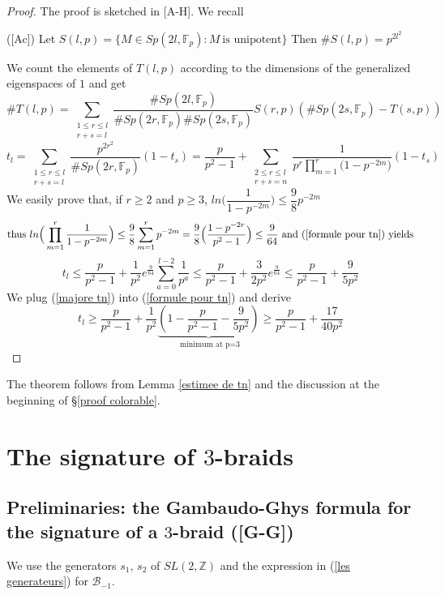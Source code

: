 \documentclass[12pt]{article}
\begin{document}
\begin{proof}
	The proof is sketched in [A-H].  We recall
	\begin{prop}([Ac]) Let $S(l,p)=\{M\in Sp(2l, \mathbb{F}_p): M\ \mbox{is unipotent}\}$ Then $\# S(l,p)=p^{2l^2}$
\end{prop}
We count the elements of $T(l,p)$ according to the dimensions of the generalized eigenspaces of $1$ and get
$$\# T(l,p)=\sum\limits_{\substack{1\leq r\leq l\\ 
		r+s=l}}\dfrac{\# Sp(2l, \mathbb{F}_p)}{\# Sp(2r, \mathbb{F}_p)\# Sp(2s, \mathbb{F}_p)}S(r,p)(\# Sp(2s, \mathbb{F}_p)-T(s,p))$$
\begin{equation}\label{formule pour tn}
t_l=\sum\limits_{\substack{1\leq r\leq l\\ 
		r+s=l}}\dfrac{p^{2r^2}}{\# Sp(2r, \mathbb{F}_p)}(1- t_s)
=\dfrac{p}{p^2-1}+\sum\limits_{\substack{2\leq r\leq l \\ 
		r+s=n}}\dfrac{1}{p^r\prod\limits_{m=1}^r\Big(1-p^{-2m}\Big)}(1- t_s)
\end{equation}
We easily prove that, if $r\geq 2$ and $p\geq 3$, $ln\Big(\dfrac{1}{1-p^{-2m}}\Big)\leq \dfrac{9}{8}p^{-2m}$\\
\[\mbox{thus}\ ln\Big(\prod\limits_{m=1}^r\dfrac{1}{1-p^{-2m}}\Big)
\leq \dfrac{9}{8}\sum_{m=1}^rp^{-2m}=\dfrac{9}{8}\Big(\dfrac{1-p^{-2r}}{p^2-1}\Big)\leq \dfrac{9}{64}\ \mbox{and (\ref{formule pour tn}) yields}\] 
\begin{equation}\label{majore tn}
t_l\leq \dfrac{p}{p^2-1}+\dfrac{1}{p^2}e^{\frac{9}{64}}\sum_{a=0}^{l-2}\dfrac{1}{p^a}\leq 
\dfrac{p}{p^2-1}+\dfrac{3}{2p^2}e^{\frac{9}{64}}\leq \dfrac{p}{p^2-1}+\dfrac{9}{5p^2}
\end{equation}
We plug (\ref{majore tn}) into (\ref{formule pour tn}) and derive
$$
t_l\geq \dfrac{p}{p^2-1}+\dfrac{1}{p^2}\underbrace{(1-\dfrac{p}{p^2-1}-\dfrac{9}{5p^2})}_{\mbox{ minimum at p=3}}\geq \dfrac{p}{p^2-1}+\dfrac{17}{40p^2} 
$$
\end{proof}
The  theorem follows from Lemma \ref{estimee de tn} and the discussion at the beginning of \S \ref{proof colorable}.
\section{The signature of $3$-braids} 
\subsection{Preliminaries: the Gambaudo-Ghys formula for the signature of a $3$-braid ([G-G])}\label{section: formule de gg} 
We use the generators $s_1$, $s_2$ of $SL(2,\mathbb{Z})$ and the expression in (\ref{les generateurs}) for $\mathcal B_{-1}$. 
\end{document}

